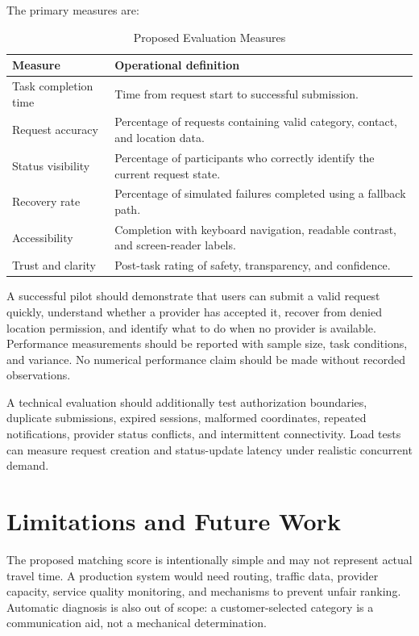 \documentclass[conference]{IEEEtran}
\begin{document}
The primary measures are:

\begin{table}[t]
\caption{Proposed Evaluation Measures}
\label{tab:metrics}
\centering
\begin{tabular}{p{} p{}}
\toprule
Measure & Operational definition \\
\midrule
Task completion time & Time from request start to successful submission. \\
Request accuracy & Percentage of requests containing valid category, contact, and location data. \\
Status visibility & Percentage of participants who correctly identify the current request state. \\
Recovery rate & Percentage of simulated failures completed using a fallback path. \\
Accessibility & Completion with keyboard navigation, readable contrast, and screen-reader labels. \\
Trust and clarity & Post-task rating of safety, transparency, and confidence. \\
\bottomrule
\end{tabular}
\end{table}

A successful pilot should demonstrate that users can submit a valid request quickly, understand whether a provider has accepted it, recover from denied location permission, and identify what to do when no provider is available. Performance measurements should be reported with sample size, task conditions, and variance. No numerical performance claim should be made without recorded observations.

A technical evaluation should additionally test authorization boundaries, duplicate submissions, expired sessions, malformed coordinates, repeated notifications, provider status conflicts, and intermittent connectivity. Load tests can measure request creation and status-update latency under realistic concurrent demand.

\section{Limitations and Future Work}

The proposed matching score is intentionally simple and may not represent actual travel time. A production system would need routing, traffic data, provider capacity, service quality monitoring, and mechanisms to prevent unfair ranking. Automatic diagnosis is also out of scope: a customer-selected category is a communication aid, not a mechanical determination.
\end{document}
